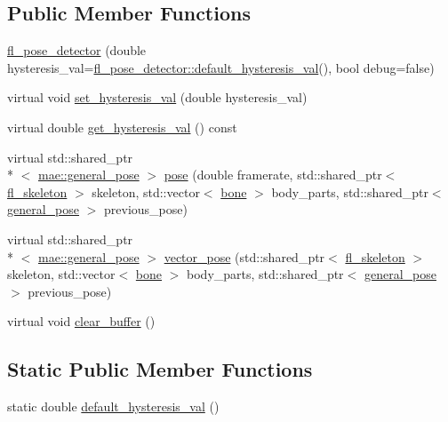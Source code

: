 \subsection*{Public Member Functions}
\begin{DoxyCompactItemize}
\item 
\hyperlink{classmae_1_1fl_1_1fl__pose__detector_a3e52ce649f55340ebcd5a2fec804278b}{fl\-\_\-pose\-\_\-detector} (double hysteresis\-\_\-val=\hyperlink{classmae_1_1fl_1_1fl__pose__detector_adb2f046d501a87de9e5589b346ef3782}{fl\-\_\-pose\-\_\-detector\-::default\-\_\-hysteresis\-\_\-val}(), bool debug=false)
\item 
virtual void \hyperlink{classmae_1_1fl_1_1fl__pose__detector_a807c41e01fed7a729058b91ff4ff90f3}{set\-\_\-hysteresis\-\_\-val} (double hysteresis\-\_\-val)
\item 
virtual double \hyperlink{classmae_1_1fl_1_1fl__pose__detector_a5347e97f3685d7168a182e7e373f09cf}{get\-\_\-hysteresis\-\_\-val} () const 
\item 
virtual std\-::shared\-\_\-ptr\\*
$<$ \hyperlink{classmae_1_1general__pose}{mae\-::general\-\_\-pose} $>$ \hyperlink{classmae_1_1fl_1_1fl__pose__detector_a3a0f6afa25ce9bc25154e93e671edd23}{pose} (double framerate, std\-::shared\-\_\-ptr$<$ \hyperlink{classmae_1_1fl_1_1fl__skeleton}{fl\-\_\-skeleton} $>$ skeleton, std\-::vector$<$ \hyperlink{classmae_1_1bone}{bone} $>$ body\-\_\-parts, std\-::shared\-\_\-ptr$<$ \hyperlink{classmae_1_1general__pose}{general\-\_\-pose} $>$ previous\-\_\-pose)
\item 
virtual std\-::shared\-\_\-ptr\\*
$<$ \hyperlink{classmae_1_1general__pose}{mae\-::general\-\_\-pose} $>$ \hyperlink{classmae_1_1fl_1_1fl__pose__detector_ae7f558696efe7f55cf4895bffd234665}{vector\-\_\-pose} (std\-::shared\-\_\-ptr$<$ \hyperlink{classmae_1_1fl_1_1fl__skeleton}{fl\-\_\-skeleton} $>$ skeleton, std\-::vector$<$ \hyperlink{classmae_1_1bone}{bone} $>$ body\-\_\-parts, std\-::shared\-\_\-ptr$<$ \hyperlink{classmae_1_1general__pose}{general\-\_\-pose} $>$ previous\-\_\-pose)
\item 
virtual void \hyperlink{classmae_1_1fl_1_1fl__pose__detector_ad15e75a020123c1608554f0dd693758a}{clear\-\_\-buffer} ()
\end{DoxyCompactItemize}
\subsection*{Static Public Member Functions}
\begin{DoxyCompactItemize}
\item 
static double \hyperlink{classmae_1_1fl_1_1fl__pose__detector_adb2f046d501a87de9e5589b346ef3782}{default\-\_\-hysteresis\-\_\-val} ()
\end{DoxyCompactItemize}


